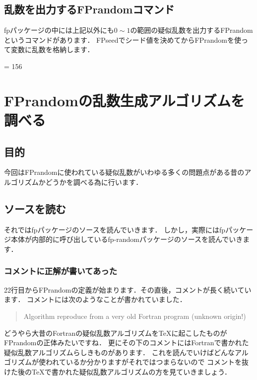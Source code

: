 \subsection{乱数を出力するFPrandomコマンド}
fpパッケージの中には上記以外にも$0\sim 1$の範囲の疑似乱数を出力するFPrandomというコマンドがあります．
FPseedでシード値を決めてからFPrandomを使って変数に乱数を格納します．
\begin{texcode}
\FPseed = 156
\FPrandom{\result}
\FPprint{\result}
\end{texcode}

\section{FPrandomの乱数生成アルゴリズムを調べる}
\subsection{目的}
今回はFPrandomに使われている疑似乱数がいわゆる多くの問題点がある昔のアルゴリズムかどうかを調べる為に行います．

\subsection{ソースを読む}
それではfpパッケージのソースを読んでいきます．
しかし，実際にはfpパッケージ本体が内部的に呼び出しているfp-randomパッケージのソースを読んでいきます．

\subsubsection{コメントに正解が書いてあった}
22行目からFPrandomの定義が始まります．その直後，コメントが長く続いています．
コメントには次のようなことが書かれていました．
\begin{quote}
Algorithm reproduce from a very old Fortran program (unknown origin!)
\end{quote}
どうやら大昔のFortranの疑似乱数アルゴリズムを\TeX に起こしたものがFPrandomの正体みたいですね．
更にその下のコメントにはFortranで書かれた疑似乱数アルゴリズムらしきものがあります．
これを読んでいけばどんなアルゴリズムが使われているか分かりますがそれではつまらないので
コメントを抜けた後の\TeX で書かれた疑似乱数アルゴリズムの方を見ていきましょう．

